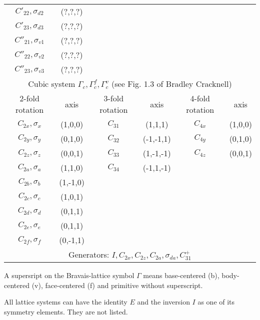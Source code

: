 \documentclass[11pt,a4paper]{report}
\begin{document}
\begin{center}
\begin{tabular}{||c|c|||c|c||c|c||}
$C'_{22},\sigma_{d2}$ & (?,?,?)  &  &  &   &\\  
$C'_{23},\sigma_{d3}$ & (?,?,?)  &  &  &   &\\  
$C''_{21},\sigma_{v1}$ & (?,?,?)  &  &  &   &\\  
$C''_{22},\sigma_{v2}$ & (?,?,?)  &  &  &   &\\  
$C''_{23},\sigma_{v3}$ & (?,?,?)  &  &  &   &\\  
\hline
\hline
\multicolumn{6}{|c|}{Cubic system $\Gamma_c,\Gamma_c^f,\Gamma_c^v$
(see Fig. 1.3 of Bradley Cracknell\cite{bradley72_book})}\\
\hline
2-fold rotation & axis & 3-fold rotation & axis &4-fold rotation & axis \\
\hline
$C_{2x},\sigma_x$ & (1,0,0)  & $C_{31}$ & (1,1,1)  &   $C_{4x}$ & (1,0,0)\\  
$C_{2y},\sigma_y$ & (0,1,0)  & $C_{32}$ & (-1,-1,1)&   $C_{4y}$ & (0,1,0)\\  
$C_{2z},\sigma_z$ & (0,0,1)  & $C_{33}$ & (1,-1,-1)&   $C_{4z}$ & (0,0,1)\\  
$C_{2a},\sigma_a$ & (1,1,0)  & $C_{34}$ & (-1,1,-1)&           &\\  
$C_{2b},\sigma_b$ & (1,-1,0) &         &    & &\\
$C_{2c},\sigma_c$ & (1,0,1)  &         &  & &\\
$C_{2d},\sigma_d$ & (0,1,1)  &         &  & &\\
$C_{2e},\sigma_e$ & (0,1,1)  &         &  & &\\
$C_{2f},\sigma_f$ & (0,-1,1) &         &  & &\\
\hline
\multicolumn{6}{|c|}{Generators: $I, C_{2x}, C_{2z}, C_{2a}, \sigma_{da}, C^+_{31}$}\\
\hline
\end{tabular}
\end{center}
A supersript on the Bravais-lattice symbol $\Gamma$ means
base-centered (b), body-centered (v), face-centered (f) and primitive
without superscript.

All lattice systems can have the identity $E$ and the inversion $I$ as
one of its symmetry elements. They are not listed.
\end{document}
